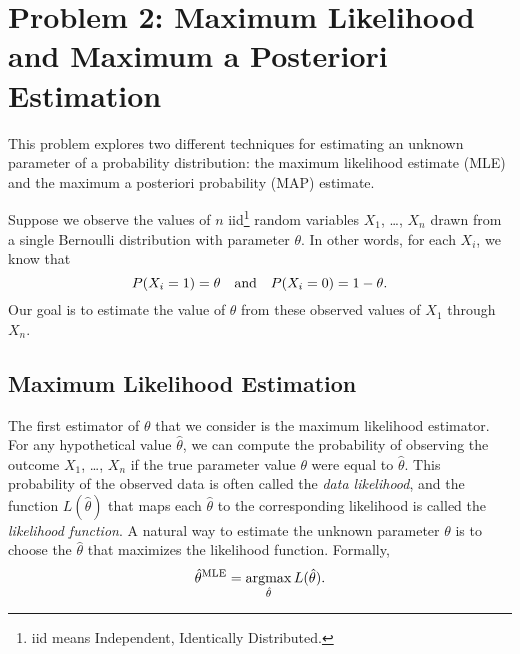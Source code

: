 \documentclass{article}
\newcommand \mle [1]{{\hat #1}^{\rm MLE}}
\newcommand \argmax {\operatorname*{argmax}}
\begin{document}
\section*{Problem 2: Maximum Likelihood and Maximum a Posteriori
  Estimation}

This problem explores two different techniques for estimating an
unknown parameter of a probability distribution: the maximum
likelihood estimate (MLE) and the maximum a posteriori probability
(MAP) estimate.

Suppose we observe the values of $n$ iid\footnote{iid means
  Independent, Identically Distributed.} random variables $X_1$,
\dots, $X_n$ drawn from a single Bernoulli distribution with parameter
$\theta$. In other words, for each $X_i$, we know that
\[
P(X_i = 1) = \theta \quad \hbox{and} \quad P(X_i = 0) = 1 - \theta.
\]
Our goal is to estimate the value of $\theta$ from these observed
values of $X_1$ through $X_n$.

\subsection*{Maximum Likelihood Estimation}

The first estimator of $\theta$ that we consider is the maximum
likelihood estimator. For any hypothetical value $\hat \theta$, we can
compute the probability of observing the outcome $X_1$, \dots, $X_n$
if the true parameter value $\theta$ were equal to $\hat \theta$.
This probability of the observed data is often called the {\em data
  likelihood}, and the function $L(\hat \theta)$ that maps each
$\hat \theta$ to the corresponding likelihood is called the
\emph{likelihood function}.  A natural way to estimate the unknown
parameter $\theta$ is to choose the $\hat \theta$ that maximizes the
likelihood function. Formally,
\[
\mle{\theta} = \argmax_{\hat \theta} L(\hat \theta).
\]
\end{document}

